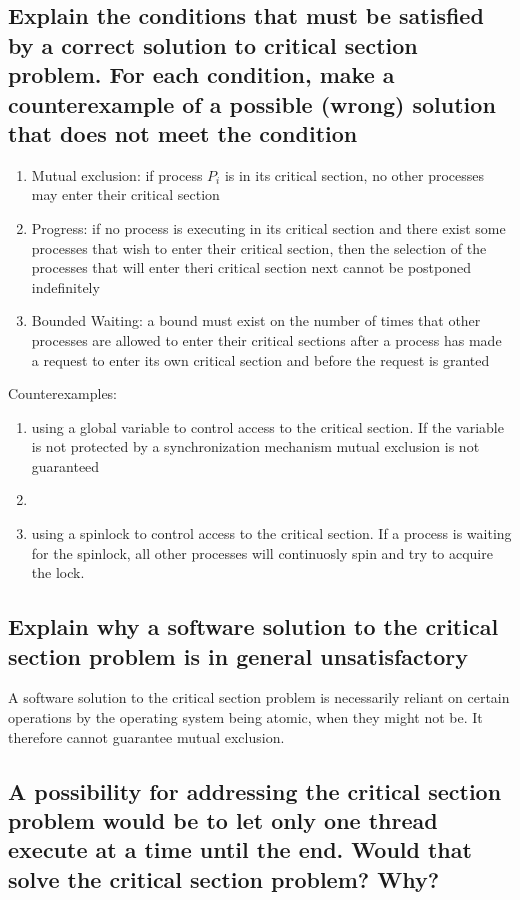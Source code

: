 \documentclass{article}
\begin{document}
\subsection{Explain the conditions that must be satisfied by a correct solution to critical section problem. For each condition, make a counterexample of a possible (wrong) solution that does not meet the condition}
\begin{enumerate}
    \item Mutual exclusion: if process $P_i$ is in its critical section, no other processes may enter their critical section
    \item Progress: if no process is executing in its critical section and there exist some processes that wish to enter their critical section, then the selection of the processes that will enter theri critical section next cannot be postponed indefinitely
    \item Bounded Waiting: a bound must exist on the number of times that other processes are allowed to enter their critical sections after a process has made a request to enter its own critical section and before the request is granted
\end{enumerate}
Counterexamples: \begin{enumerate}
    \item using a global variable to control access to the critical section. If the variable is not protected by a synchronization mechanism mutual exclusion is not guaranteed
    \item %
    \item using a spinlock to control access to the critical section. If a process is waiting for the spinlock, all other processes will continuosly spin and try to acquire the lock.
\end{enumerate}

\subsection{Explain why a software solution to the critical section problem is in general unsatisfactory}
A software solution to the critical section problem is necessarily reliant on certain operations by the operating system being atomic, when they might not be. It therefore cannot guarantee mutual exclusion.

\subsection{A possibility for addressing the critical section problem would be to let only one thread execute at a time until the end. Would that solve the critical section problem? Why?}
\end{document}
